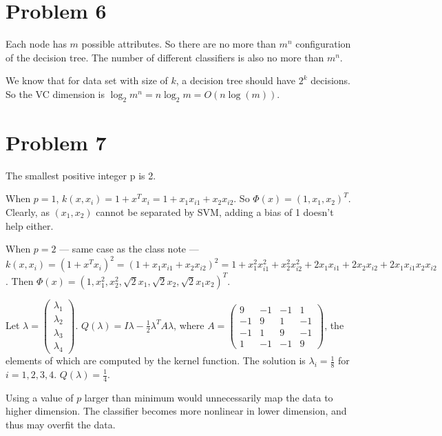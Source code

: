 \documentclass[10pt]{article}
\begin{document}
\section*{Problem 6}

Each node has $m$ possible attributes. So there are no more than
$m^n$ configuration of the decision tree. The number of different
classifiers is also no more than $m^n$.

We know that for data set with size of $k$, a decision tree should
have $2^k$ decisions. So the VC dimension is $\log_2{m^n} = n
\log_2{m} = O(n\log(m))$.

\section*{Problem 7}

The smallest positive integer p is 2.

When $p = 1$, $k(x, x_i) = 1 + x^T x_i = 1 + x_1 x_{i1} + x_2 x_{i2}$.
So $\Phi(x) = (1, x_1, x_2)^T$. Clearly, as $(x_1, x_2)$ cannot be
separated by SVM, adding a bias of 1 doesn't help either.

When $p = 2$ --- same case as the class note --- $k(x, x_i) = (1 + x^T
x_i)^2 = (1 + x_1 x_{i1} + x_2 x_{i2})^2 = 1 + x_1^2 x_{i1}^2 + x_2^2
x_{i2}^2 + 2x_1x_{i1} + 2x_2x_{i2} + 2x_1x_{i1}x_2x_{i2}$. Then
$\Phi(x) = (1, x_1^2, x_2^2, \sqrt{2}x_1, \sqrt{2}x_2,
\sqrt{2}x_1x_2)^T$.

% 
% 
% 

Let $\lambda = \begin{pmatrix}
\lambda_1\\\lambda_2\\\lambda_3\\\lambda_4 \end{pmatrix}$.
$Q(\lambda) = I\lambda - \frac{1}{2} \lambda^T A \lambda $, where $A =
\begin{pmatrix}
9 & -1 & -1 & 1\\
-1 & 9 & 1 & -1\\
-1 & 1 & 9 & -1\\
1 & -1 & -1 & 9
\end{pmatrix}
$, the elements of which are computed by the kernel function. The
solution is $\lambda_i = \frac{1}{8}$ for $i = 1,2,3,4$.  $Q(\lambda)
= \frac{1}{4}$. 

\hfill

Using a value of $p$ larger than minimum would unnecessarily map the
data to higher dimension. The classifier becomes more nonlinear in
lower dimension, and thus may overfit the data.
\end{document}
